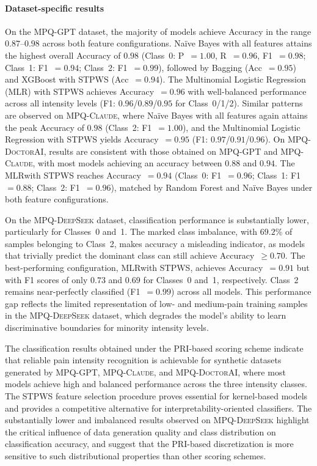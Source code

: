 \documentclass[preprint,12pt,authoryear]{elsarticle}
\newcommand{\dbGPT}{\small\textsc{MPQ-GPT}\xspace}
\newcommand{\dbClaude}{\small\textsc{MPQ-Claude}\xspace}
\newcommand{\dbDeepSeek}{\small\textsc{MPQ-DeepSeek}\xspace}
\newcommand{\dbDoctorAI}{\small\textsc{MPQ-DoctorAI}\xspace}
\begin{document}
\paragraph{Dataset-specific results}
On the \dbGPT dataset, the majority of models achieve Accuracy in the range $0.87$--$0.98$ across both feature configurations. Naïve Bayes with all features attains the highest overall Accuracy of $0.98$ (Class~0: P~$= 1.00$, R~$= 0.96$, F1~$= 0.98$; Class~1: F1~$= 0.94$; Class~2: F1~$= 0.99$), followed by Bagging (Acc~$= 0.95$) and XGBoost with STPWS (Acc~$= 0.94$). The Multinomial Logistic Regression (MLR) with STPWS achieves Accuracy~$= 0.96$ with well-balanced performance across all intensity levels (F1: $0.96$/$0.89$/$0.95$ for Class~0/1/2). Similar patterns are observed on \dbClaude, where Naïve Bayes with all features again attains the peak Accuracy of $0.98$ (Class~2: F1~$= 1.00$), and the Multinomial Logistic Regression with STPWS yields Accuracy~$= 0.95$ (F1: $0.97$/$0.91$/$0.96$). On \dbDoctorAI, results are consistent with those obtained on \dbGPT and \dbClaude, with most models achieving an accuracy between $0.88$ and $0.94$. The MLRwith STPWS reaches Accuracy~$= 0.94$ (Class~0: F1~$= 0.96$; Class~1: F1~$= 0.88$; Class~2: F1~$= 0.96$), matched by Random Forest and Naïve Bayes under both feature configurations.

On the \dbDeepSeek dataset, classification performance is substantially lower, particularly for Classes~0 and~1. The marked class imbalance, with $69.2$\% of samples belonging to Class~2, makes accuracy a misleading indicator, as models that trivially predict the dominant class can still achieve Accuracy~$\geq 0.70$. The best-performing configuration, MLRwith STPWS, achieves Accuracy~$= 0.91$ but with F1 scores of only $0.73$ and $0.69$ for Classes~0 and~1, respectively. Class~2 remains near-perfectly classified (F1~$= 0.99$) across all models. This performance gap reflects the limited representation of low- and medium-pain training samples in the \dbDeepSeek dataset, which degrades the model's ability to learn discriminative boundaries for minority intensity levels.

The classification results obtained under the PRI-based scoring scheme indicate that reliable pain intensity recognition is achievable for synthetic datasets generated by \dbGPT, \dbClaude, and \dbDoctorAI, where most models achieve high and balanced performance across the three intensity classes. The STPWS feature selection procedure proves essential for kernel-based models and provides a competitive alternative for interpretability-oriented classifiers. The substantially lower and imbalanced results observed on \dbDeepSeek highlight the critical influence of data generation quality and class distribution on classification accuracy, and suggest that the PRI-based discretization is more sensitive to such distributional properties than other scoring schemes.
\end{document}
